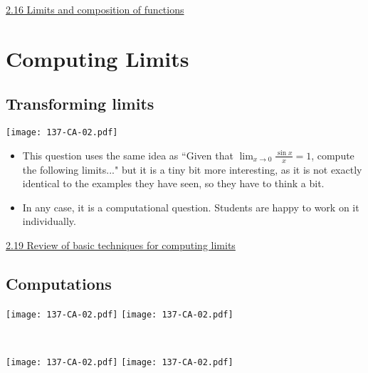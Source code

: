 \documentclass[11pt]{article}
\newcommand{\n}{\newpage}
\newcommand {\DS} [1] {${\displaystyle #1}$}
\newcommand{\nl}{\hfill \vspace{-1.1\baselineskip}} %
\newcommand{\vxvi}{\hspace{8mm} \href{https://www.youtube.com/watch?v=y1WYANJ7IPc&list=PLlwePzQY_wW8P_I8BFgm0-upywEwTKd8_&index=16}{2.16 Limits and composition of functions}}
\newcommand{\vxix}{\hspace{8mm} \href{https://www.youtube.com/watch?v=8kogZvSk2S4&list=PLlwePzQY_wW8P_I8BFgm0-upywEwTKd8_&index=19}{2.19 Review of basic techniques for computing limits}}
\begin{document}
\begin{videos}
\vxvi
\end{videos}

\n
\section{Computing Limits}
\subsection{Transforming limits} 

\begin{center}
{ \texttt{[image: 137-CA-02.pdf]}}
\end{center}

\begin{comments}
\nl
	\begin{itemize}
		\item  This question uses the same idea as ``Given that \DS{\lim_{x \to 0} \frac{\sin x}{x}=1}, compute the following limits..." but it is a tiny bit more interesting, as it is not exactly identical to the examples they have seen, so they have to think a bit.  
		\item In any case, it is a computational question.  Students are happy to work on it individually.
	\end{itemize}
\end{comments}

\begin{videos}
\vxix
\end{videos}

\n
\newpage
\subsection{Computations} 

\begin{center}
{ \texttt{[image: 137-CA-02.pdf]}}
\quad
{ \texttt{[image: 137-CA-02.pdf]}}

\

{ \texttt{[image: 137-CA-02.pdf]}}
\quad
{ \texttt{[image: 137-CA-02.pdf]}}

\end{center}
\end{document}
